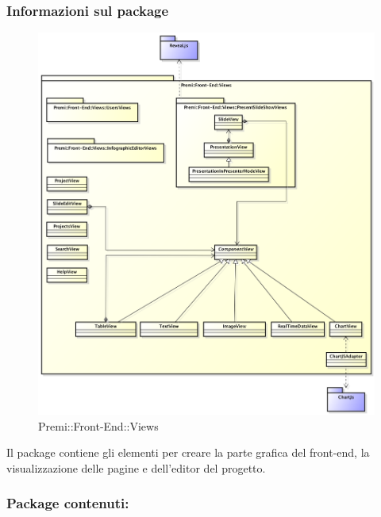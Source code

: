 	\subsubsection*{Informazioni sul package}
		\begin{figure}[h]
			\centering
			\includegraphics[width=0.9\linewidth]{img/front-end_views}
			\caption[Premi::Front-End::Views]{Premi::Front-End::Views}
		\end{figure}
		Il package contiene gli elementi per creare la parte grafica del \gls{front-end}, la visualizzazione delle pagine e dell'editor del progetto.

	\subsubsection*{Package contenuti:}

